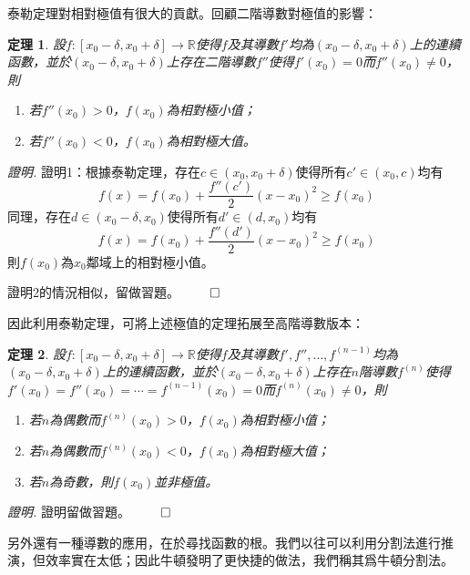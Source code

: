 \documentclass[12pt]{article}
\newtheorem*{theorem}{定理}
\renewenvironment*{proof}{\textit{證明.}}{\hfill$\qed$}
\begin{document}
    泰勒定理對相對極值有很大的貢獻。回顧二階導數對極值的影響：

    \begin{theorem}
        設$f:[x_0-\delta,x_0+\delta]\to\mathbb{R}$使得$f$及其導數$f'$均為$(x_0-\delta,x_0+\delta)$上的連續函數，並於$(x_0-\delta,x_0+\delta)$上存在二階導數$f''$使得$f'(x_0)=0$而$f''(x_0)\neq 0$，則\begin{enumerate}
            \item 若$f''(x_0)>0$，$f(x_0)$為相對極小值；
            \item 若$f''(x_0)<0$，$f(x_0)$為相對極大值。
        \end{enumerate}
    \end{theorem}

    \begin{proof}
        證明1：根據泰勒定理，存在$c\in(x_0,x_0+\delta)$使得所有$c'\in(x_0,c)$均有$$f(x)=f(x_0)+\frac{f''(c')}{2}(x-x_0)^2\geq f(x_0)$$同理，存在$d\in(x_0-\delta,x_0)$使得所有$d'\in(d,x_0)$均有$$f(x)=f(x_0)+\frac{f''(d')}{2}(x-x_0)^2\geq f(x_0)$$則$f(x_0)$為$x_0$鄰域上的相對極小值。

        證明2的情況相似，留做習題。
    \end{proof}

    因此利用泰勒定理，可將上述極值的定理拓展至高階導數版本：

    \begin{theorem}
        設$f:[x_0-\delta,x_0+\delta]\to\mathbb{R}$使得$f$及其導數$f',f'',\dots,f^{(n-1)}$均為$(x_0-\delta,x_0+\delta)$上的連續函數，並於$(x_0-\delta,x_0+\delta)$上存在$n$階導數$f^{(n)}$使得$f'(x_0)=f''(x_0)=\cdots=f^{(n-1)}(x_0)=0$而$f^{(n)}(x_0)\neq 0$，則\begin{enumerate}
            \item 若$n$為偶數而$f^{(n)}(x_0)>0$，$f(x_0)$為相對極小值；
            \item 若$n$為偶數而$f^{(n)}(x_0)<0$，$f(x_0)$為相對極大值；
            \item 若$n$為奇數，則$f(x_0)$並非極值。
        \end{enumerate}
    \end{theorem}

    \begin{proof}
        證明留做習題。
    \end{proof}

    另外還有一種導數的應用，在於尋找函數的根。我們以往可以利用分割法進行推演，但效率實在太低；因此牛頓發明了更快捷的做法，我們稱其爲牛頓分割法。
\end{document}
